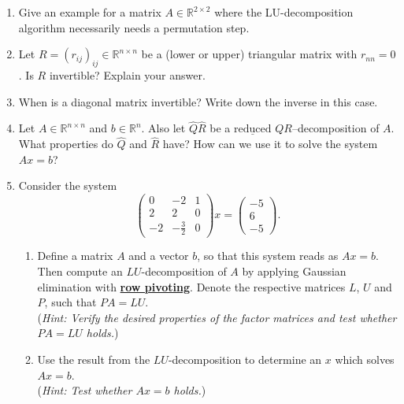 \begin{enumerate}
	\item Give an example for a matrix $A \in \mathbb{R}^{2 \times 2}$ where the LU-decomposition algorithm
	necessarily needs a permutation step. 
\item Let $R=(r_{ij})_{ij} \in \mathbb{R}^{n \times n}$ be a (lower or upper) triangular matrix with $r_{nn} = 0$. Is $R$ invertible? Explain your answer.
\item When is a diagonal matrix invertible? Write down the inverse in this case.
\item Let $A\in\mathbb{R}^{n \times n}$ and $b \in \mathbb{R}^n$. Also let $\widehat{Q}\widehat{R}$ be a $\underline{\text{reduced}}$ $QR$--decomposition of $A$. What properties do $\widehat{Q}$ and $\widehat{R}$ have? How can we use it to solve the system $Ax = b$?
\item Consider the system
$$
\begin{pmatrix}
0	&-2				& 1\\
2	&2				& 0\\
-2	&-\frac{3}{2}	&0
\end{pmatrix} x = 
\begin{pmatrix}
-5\\
6\\
-5
\end{pmatrix}.
$$
\begin{enumerate}
	\item  Define a matrix $A$ and a vector $b$, so that this system reads as $Ax = b$. Then compute an $LU$-decomposition of $A$ by applying Gaussian elimination with \underline{\textbf{row pivoting}}. Denote the respective matrices $L$, $U$ and $P$, such that $PA = LU$.\\
	(\textit{Hint: Verify the desired properties of the factor matrices and test whether  $PA = LU$ holds.})
	\item Use the result from the $LU$-decomposition to determine an $x$ which solves $Ax=b$.\\
	(\textit{Hint: Test whether $Ax=b$ holds.})
\end{enumerate}
\end{enumerate}
 